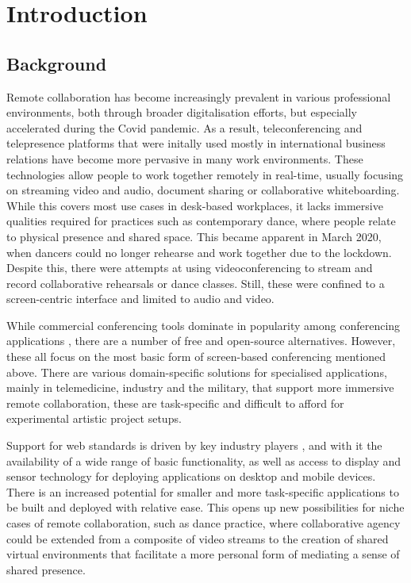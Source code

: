 \chapter{Introduction}
\label{chapter:introduction}

\section{Background}

Remote collaboration has become increasingly prevalent in various professional environments, both through broader digitalisation efforts, but especially accelerated during the Covid pandemic.
As a result, teleconferencing and telepresence platforms that were initally used mostly in international business relations have become more pervasive in many work environments.
These technologies allow people to work together remotely in real-time, usually focusing on streaming video and audio, document sharing or collaborative whiteboarding.
While this covers most use cases in desk-based workplaces, it lacks immersive qualities required for practices such as contemporary dance, where people relate to physical presence and shared space.
This became apparent in March 2020, when dancers could no longer rehearse and work together due to the lockdown.
Despite this, there were attempts at using videoconferencing to stream and record collaborative rehearsals or dance classes.
Still, these were confined to a screen-centric interface and limited to audio and video.

While commercial conferencing tools dominate in popularity among conferencing applications \parencite{mostPopularConferencingPlatforms}, there are a number of free and open-source alternatives.
However, these all focus on the most basic form of screen-based conferencing mentioned above.
There are various domain-specific solutions for specialised applications, mainly in telemedicine, industry and the military, that support more immersive remote collaboration, these are task-specific and difficult to afford for experimental artistic project setups.

Support for web standards is driven by key industry players \parencite{pushingInteroperabilityForward}, and with it the availability of a wide range of basic functionality, as well as access to display and sensor technology for deploying applications on desktop and mobile devices.
There is an increased potential for smaller and more task-specific applications to be built and deployed with relative ease.
This opens up new possibilities for niche cases of remote collaboration, such as dance practice, where collaborative agency could be extended from a composite of video streams to the creation of shared virtual environments that facilitate a more personal form of mediating a sense of shared presence.


